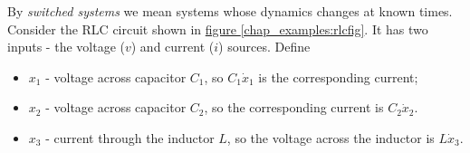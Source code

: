 \documentclass[letterpaper,10pt,english]{sphinxmanual}
\begin{document}
By \emph{switched systems} we mean systems whose dynamics changes at known
times. Consider the RLC circuit shown in \hyperref[chap_examples:rlcfig]{figure  \ref*{chap_examples:rlcfig}}. It has two
inputs - the voltage ($v$) and current ($i$) sources. Define
\begin{itemize}
\item {} 
$x_1$ - voltage across capacitor $C_1$, so
$C_1\dot{x}_1$ is the corresponding current;

\item {} 
$x_2$ - voltage across capacitor $C_2$, so the
corresponding current is $C_2\dot{x}_2$.

\item {} 
$x_3$ - current through the inductor $L$, so the voltage
across the inductor is $L\dot{x}_3$.

\end{itemize}
\end{document}
